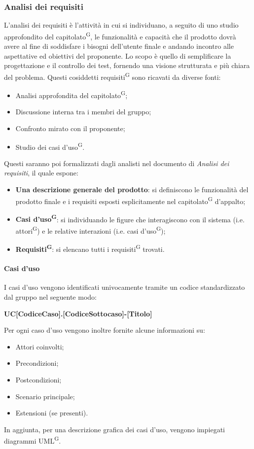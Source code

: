 \subsubsection{Analisi dei requisiti}
L’analisi dei requisiti è l'attività in cui si individuano, a seguito di uno studio approfondito del capitolato\textsuperscript{G}, le funzionalità e capacità che il prodotto dovrà avere al fine di soddisfare i bisogni dell'utente finale e andando incontro alle aspettative ed obiettivi del proponente. Lo scopo è quello di semplificare la progettazione e il controllo dei test, fornendo una visione strutturata e più chiara del problema.
Questi cosiddetti requisiti\textsuperscript{G} sono ricavati da diverse fonti:
\begin{itemize}
    \item Analisi approfondita del capitolato\textsuperscript{G};
    \item Discussione interna tra i membri del gruppo;
    \item Confronto mirato con il proponente;
    \item Studio dei casi d'uso\textsuperscript{G}.
\end{itemize}
Questi saranno poi formalizzati dagli analisti nel documento di \textit{Analisi dei requisiti}, 
il quale espone:
\begin{itemize}
    \item \textbf{Una descrizione generale del prodotto}: si definiscono le funzionalità del prodotto finale e i requisiti esposti esplicitamente nel capitolato\textsuperscript{G} d'appalto;
    \item \textbf{Casi d'uso\textsuperscript{G}}: si individuando le figure che interagiscono con il sistema (i.e. attori\textsuperscript{G}) e le relative interazioni (i.e. casi d'uso\textsuperscript{G});
    \item \textbf{Requisiti\textsuperscript{G}}: si elencano tutti i requisiti\textsuperscript{G} trovati.
\end{itemize}

\paragraph{Casi d'uso}
I casi d'uso vengono identificati univocamente tramite un codice standardizzato dal gruppo nel seguente modo:
\begin{center}
    \textbf{UC[CodiceCaso].[CodiceSottocaso]-[Titolo]}
\end{center}
Per ogni caso d'uso vengono inoltre fornite alcune informazioni su:
\begin{itemize}
    \item Attori coinvolti;
    \item Precondizioni;
    \item Postcondizioni;
    \item Scenario principale;
    \item Estensioni (se presenti).
\end{itemize}
In aggiunta, per una descrizione grafica dei casi d'uso, vengono impiegati diagrammi UML\textsuperscript{G}.

